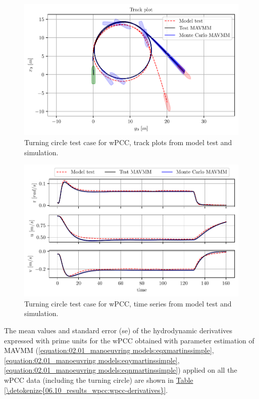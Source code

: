 \begin{figure}[!htb]
\centering
\includegraphics{kappa/images/10.pdf}
\caption{Turning circle test case for wPCC, track plots from model test and simulation.}\label{\detokenize{06.10_results_wpcc:fig-track-plot-testing-sim}}\end{figure}

\begin{figure}[!htb]
\centering
\includegraphics{kappa/images/11.pdf}
\caption{Turning circle test case for wPCC, time series from model test and simulation.}\label{\detokenize{06.10_results_wpcc:fig-testing-sim}}\end{figure}



The mean values and standard error (se) of the hydrodynamic derivatives expressed with prime units for the wPCC obtained with parameter estimation of MAVMM (\autoref{equation:02.01_manoeuvring models:eqxmartinssimple}, \autoref{equation:02.01_manoeuvring models:eqymartinssimple},  \autoref{equation:02.01_manoeuvring models:eqnmartinssimple}) applied on all the wPCC data (including the turning circle)  are shown in \hyperref[\detokenize{06.10_results_wpcc:wpcc-derivatives}]{Table \ref{\detokenize{06.10_results_wpcc:wpcc-derivatives}}}.

